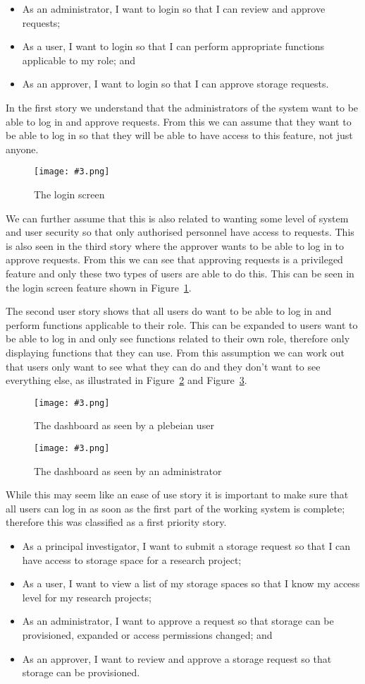 \documentclass[a4paper,titlepage,12pt]{article}
\newcommand\figimg[4][\textwidth]{
	\begin{figure}
		\caption{#4}
		\label{fig:#2}
		\texttt{[image: \#3.png]}
	\end{figure}
}
\begin{document}
\begin{itemize}
	\item As an administrator, I want to login so that I can review and
	      approve requests;
	\item As a user, I want to login so that I can perform appropriate
	      functions applicable to my role; and
	\item As an approver, I want to login so that I can approve storage
	      requests.
\end{itemize}

In the first story we understand that the administrators of the system want to
be able to log in and approve requests. From this we can assume that they want
to be able to log in so that they will be able to have access to this feature,
not just anyone.

\figimg{login}{login}{The login screen}

We can further assume that this is also related to wanting some level of system
and user security so that only authorised personnel have access to requests.
This is also seen in the third story where the approver wants to be able to log
in to approve requests. From this we can see that approving requests is a
privileged feature and only these two types of users are able to do this. This
can be seen in the login screen feature shown in Figure~\ref{fig:login}.

The second user story shows that all users do want to be able to log in and
perform functions applicable to their role. This can be expanded to users want
to be able to log in and only see functions related to their own role,
therefore only displaying functions that they can use. From this assumption we
can work out that users only want to see what they can do and they don't want
to see everything else, as illustrated in Figure~\ref{fig:user0} and
Figure~\ref{fig:user2}.

\figimg{user0}{user0}{The dashboard as seen by a plebeian user}

\figimg{user2}{user2}{The dashboard as seen by an administrator}

While this may seem like an ease of use story it is important to make sure that
all users can log in as soon as the first part of the working system is
complete; therefore this was classified as a first priority story.

\begin{itemize}
	\item As a principal investigator, I want to submit a storage request
	      so that I can have access to storage space for a research
	      project;
	\item As a user, I want to view a list of my storage spaces so that I
	      know my access level for my research projects;
	\item As an administrator, I want to approve a request so that storage
	      can be provisioned, expanded or access permissions changed; and
	\item As an approver, I want to review and approve a storage request so
	      that storage can be provisioned.
\end{itemize}
\end{document}

